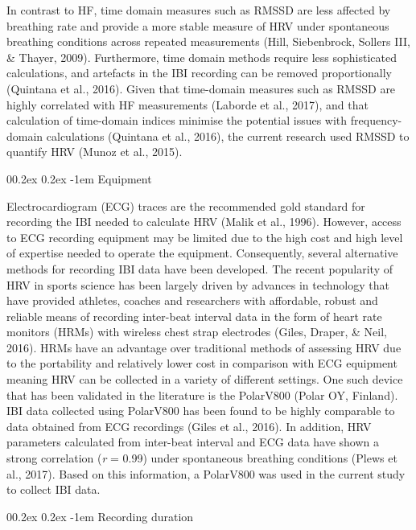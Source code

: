 \documentclass[
  english,
  man,floatsintext]{apa6}
\makeatletter
\renewcommand{\paragraph}{\@startsection{paragraph}{4}{\parindent}%
  {0\baselineskip \@plus 0.2ex \@minus 0.2ex}%
  {-1em}%
  {\normalfont\normalsize\bfseries\itshape\typesectitle}}
\makeatother
\begin{document}
In contrast to HF, time domain measures such as RMSSD are less affected by breathing rate and provide a more stable measure of HRV under spontaneous breathing conditions across repeated measurements (Hill, Siebenbrock, Sollers III, \& Thayer, 2009).
Furthermore, time domain methods require less sophisticated calculations, and artefacts in the IBI recording can be removed proportionally (Quintana et al., 2016).
Given that time-domain measures such as RMSSD are highly correlated with HF measurements (Laborde et al., 2017), and that calculation of time-domain indices minimise the potential issues with frequency-domain calculations (Quintana et al., 2016), the current research used RMSSD to quantify HRV (Munoz et al., 2015).

\hypertarget{equipment}{%
\paragraph{Equipment}\label{equipment}}

Electrocardiogram (ECG) traces are the recommended gold standard for recording the IBI needed to calculate HRV (Malik et al., 1996).
However, access to ECG recording equipment may be limited due to the high cost and high level of expertise needed to operate the equipment.
Consequently, several alternative methods for recording IBI data have been developed.
The recent popularity of HRV in sports science has been largely driven by advances in technology that have provided athletes, coaches and researchers with affordable, robust and reliable means of recording inter-beat interval data in the form of heart rate monitors (HRMs) with wireless chest strap electrodes (Giles, Draper, \& Neil, 2016).
HRMs have an advantage over traditional methods of assessing HRV due to the portability and relatively lower cost in comparison with ECG equipment meaning HRV can be collected in a variety of different settings.
One such device that has been validated in the literature is the PolarV800 (Polar OY, Finland).
IBI data collected using PolarV800 has been found to be highly comparable to data obtained from ECG recordings (Giles et al., 2016).
In addition, HRV parameters calculated from inter-beat interval and ECG data have shown a strong correlation (\emph{r} = 0.99) under spontaneous breathing conditions (Plews et al., 2017).
Based on this information, a PolarV800 was used in the current study to collect IBI data.

\hypertarget{recording-duration}{%
\paragraph{Recording duration}\label{recording-duration}}
\end{document}
